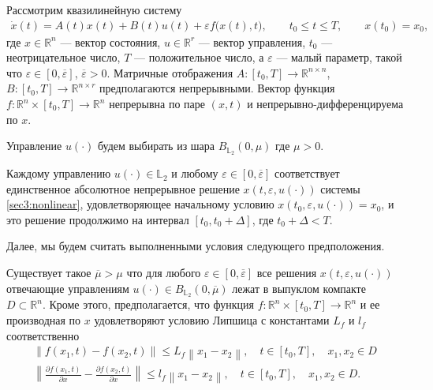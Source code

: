 \documentclass[../main.tex]{subfiles}
\begin{document}
Рассмотрим квазилинейную систему
\begin{gather}\label{sec3:nonlinear}
	\dot{x}(t) = A(t)x(t)+B(t)u(t)+\varepsilon f\big(x(t),t\big), \qquad t_0 \leqslant t \leqslant T, \qquad x(t_0) = x_0,
\end{gather}
где $ x \in \mathbb{R}^n $ --- вектор состояния, $ u \in \mathbb{R}^r $ --- вектор управления, $t_0$ --- неотрицательное число, $T$ --- положительное число, а $\varepsilon$ --- малый параметр, такой что $\varepsilon \in [0,\overline{\varepsilon}]$, $ \overline{\varepsilon} > 0$. Матричные отображения  $A:[t_0,T] \to \mathbb{R}^{n\times n} $, $B: [t_0,T] \to \mathbb{R}^{n\times r} $ предполагаются непрерывными. 
Вектор функция $f: \mathbb{R}^n \times [t_0,T] \to \mathbb{R}^n$ непрерывна по паре $(x,t)$ и непрерывно-дифференцируема по  $x$.

Управление $ u(\cdot) $ будем выбирать из шара $ B_{\mathbb{L}_2}(0,\mu) $ где $ \mu > 0$.

Каждому управлению $u(\cdot) \in \mathbb{L}_2$ и любому $\varepsilon \in [0,\overline{\varepsilon}]$ соответствует единственное абсолютное непрерывное решение $ x(t,\varepsilon, u(\cdot)) $ системы \eqref{sec3:nonlinear}, удовлетворяющее начальному условию $ x(t_0,\varepsilon, u(\cdot)) = x_0$, и это решение продолжимо на интервал $[t_0, t_0 + \Delta]$, где $t_0 + \Delta < T$. 

Далее, мы будем считать выполненными условия следующего предположения.

\begin{assumption}\label{as:right_hand_side_conditions}
	
	Существует такое $\overline{\mu} > \mu $ что для любого $\varepsilon \in [0, \overline{\varepsilon}] $ все решения $ x(t,\varepsilon, u(\cdot)) $ отвечающие управлениям $u(\cdot) \in B_{\mathbb{L}_2}(0,\overline{\mu})$  лежат в выпуклом компакте $D \subset \mathbb{R}^n$.
	Кроме этого, предполагается, что функция $f: \mathbb{R}^n \times [t_0,T] \to \mathbb{R}^n$ и ее производная по $x$ удовлетворяют условию Липшица с константами $L_f$ и $l_f$ соответственно
	\begin{gather*}
		\left\| f(x_1,t) - f(x_2,t) \right\| \leqslant L_f \left\| x_1 - x_2 \right\|, \quad t\in[t_0,T], \quad x_1, x_2 \in D\\
		\left\| \frac{\partial f(x_1,t)}{\partial x} - \frac{\partial f(x_2,t)}{\partial x} \right\| \leqslant l_f \left\| x_1 - x_2 \right\|, \quad t\in[t_0,T], \quad x_1, x_2 \in D.
	\end{gather*}
\end{assumption} 
\end{document}
